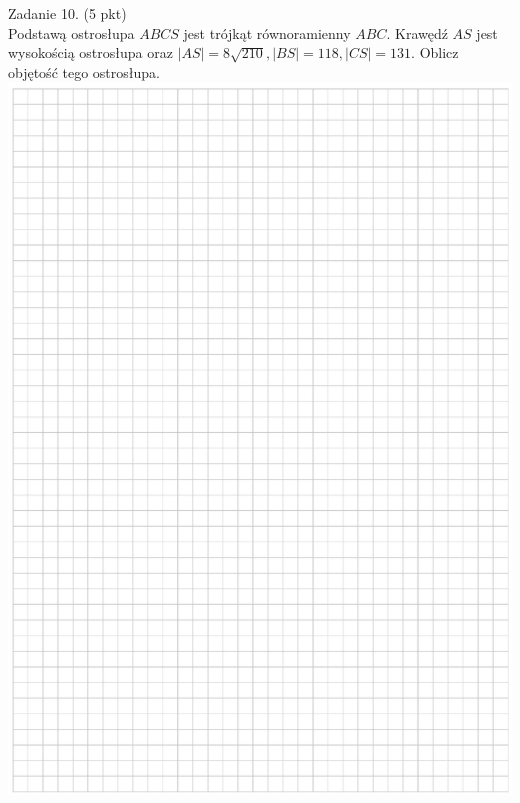 \documentclass[10pt]{article}
\begin{document}
Zadanie 10. (5 pkt)\\
Podstawą ostrosłupa \(A B C S\) jest trójkąt równoramienny \(A B C\). Krawędź \(A S\) jest wysokością ostrosłupa oraz \(|A S|=8 \sqrt{210},|B S|=118,|C S|=131\). Oblicz objętość tego ostrosłupa.\\
\includegraphics[max width=\textwidth, center]{2024_11_21_606d6e4e152fe3e9f6feg-16}\\
\end{document}

